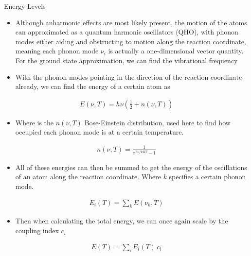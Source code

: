 \documentclass[final]{beamer}
\newlength{\colwidth}
\begin{document}
\begin{frame}[t]
\begin{columns}[t]
\begin{column}{\colwidth}
  \begin{block}{Energy Levels}
     \begin{itemize}
         \item Although anharmonic effects are most likely present, the motion of the atoms can approximated as a quantum harmonic oscillators (QHO), with phonon modes either aiding and obstructing to motion along the reaction coordinate, meaning each phonon mode $\nu_i$ is actually a one-dimensional vector quantity. For the ground state approximation, we can find the vibrational frequency  
         \item With the phonon modes pointing in the direction of the reaction coordinate already, we can find the energy of a certain atom as 
     \end{itemize}
     \begin{align*}
         E(\nu, T) = h\nu\left(\frac{1}{2} + n(\nu, T)\right)
     \end{align*}
    \begin{itemize}
        \item Where is the $n(\nu, T)$ Bose-Einstein distribution, used here to find how occupied each phonon mode is at a certain temperature.
    \end{itemize}
    \begin{align*}
        n(\nu, T) = \frac{1}{e^{\,h\nu/kBT} - 1}
    \end{align*}
    \begin{itemize}
        \item All of these energies can then be summed to get the energy of the oscillations of an atom along the reaction coordinate. Where $k$ specifies a certain phonon mode.
    \end{itemize}
    \begin{align*}
        E_i(T) = \sum_k E(\nu_k, T)
    \end{align*}
    \begin{itemize}
        \item Then when calculating the total energy, we can once again scale by the coupling index $c_i$
    \end{itemize}
    \begin{align*}
        E(T) = \sum_i E_i(T)\,c_i
    \end{align*}
  \end{block}


\end{column}
\end{columns}
\end{frame}
\end{document}
